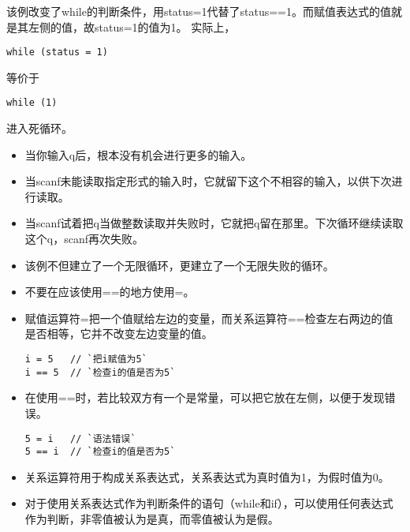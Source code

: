 \begin{frame}[fragile]
\tf 该例改变了while的判断条件，用status=1代替了status==1。而\textcolor{acolor1}{赋值表达式的值就是其左侧的值}，故status=1的值为1。
实际上，
\begin{lstlisting}
while (status = 1) 
\end{lstlisting}
等价于
\begin{lstlisting}
while (1) 
\end{lstlisting}
进入死循环。
\end{frame}

\begin{frame}[fragile]
\begin{itemize}
\item
当你输入q后，根本没有机会进行更多的输入。\\[0.1in]
\item
当scanf未能读取指定形式的输入时，它就留下这个不相容的输入，以供下次进行读取。\\[0.1in]
\item
当scanf试着把q当做整数读取并失败时，它就把q留在那里。下次循环继续读取这个q，scanf再次失败。\\[0.1in]
\item
该例不但建立了一个无限循环，更建立了一个无限失败的循环。
\end{itemize}
\end{frame}


\begin{frame}[fragile]
\begin{itemize}
\item
不要在应该使用==的地方使用=。\\[0.1in]
\item
赋值运算符=把一个值赋给左边的变量，而关系运算符==检查左右两边的值是否相等，它并不改变左边变量的值。
\begin{lstlisting}
i = 5   // `把i赋值为5`
i == 5  // `检查i的值是否为5`
\end{lstlisting}
\item
在使用==时，若比较双方有一个是常量，可以把它放在左侧，以便于发现错误。
\begin{lstlisting}
5 = i   // `语法错误`
5 == i  // `检查i的值是否为5`
\end{lstlisting}
\end{itemize}
\end{frame}


\begin{frame}[fragile]
\begin{itemize}
\item 关系运算符用于构成关系表达式，关系表达式为真时值为1，为假时值为0。\\[0.1in]
\item 对于使用关系表达式作为判断条件的语句（while和if），可以使用任何表达式作为判断，非零值被认为是真，而零值被认为是假。
\end{itemize}
\end{frame}



